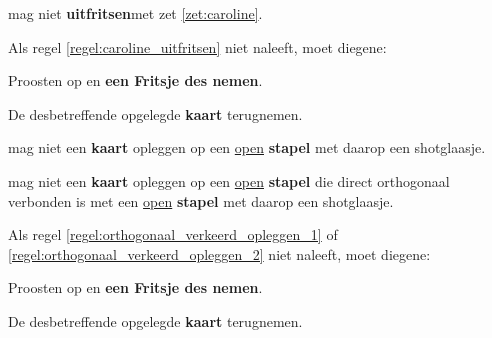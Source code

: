 
\vervolgLijst{}
\item \EenSpeler mag niet \textbf{uitfritsen}\footnotemark[2] met zet \ref{zet:caroline}\footnotemark[1].
\label{regel:caroline_uitfritsen}
\eindLijst{}

\vervolgLijst{}
\item Als \eenSpeler regel \ref{regel:caroline_uitfritsen} niet naleeft, moet diegene:
\puntLijst{}
\item Proosten op  en \textbf{een Fritsje des nemen}\footnotemark[3].
\item De desbetreffende opgelegde \textbf{kaart} terugnemen.
\eindPuntLijst{}
\label{regel:kaarten_terugnemen_6}
\eindLijst{}


\vervolgLijst{}
\item \EenSpeler mag niet een \textbf{kaart} opleggen op een \ul{open} \textbf{stapel} met daarop een shotglaasje.
\label{regel:orthogonaal_verkeerd_opleggen_1}
\eindLijst{}

\vervolgLijst{}
\item \EenSpeler mag niet een \textbf{kaart} opleggen op een \ul{open} \textbf{stapel} die direct orthogonaal\footnotemark[4] \\verbonden is met een \ul{open} \textbf{stapel} met daarop een shotglaasje.
\label{regel:orthogonaal_verkeerd_opleggen_2}
\eindLijst{}

\vervolgLijst{}
\item Als \eenSpeler regel \ref{regel:orthogonaal_verkeerd_opleggen_1} of \ref{regel:orthogonaal_verkeerd_opleggen_2} niet naleeft, moet diegene:
\puntLijst{}
\item Proosten op  en \textbf{een Fritsje des nemen}\footnotemark[3].
\item De desbetreffende opgelegde \textbf{kaart} terugnemen.
\eindPuntLijst{}
\label{regel:kaarten_terugnemen_7}
\eindLijst{}

